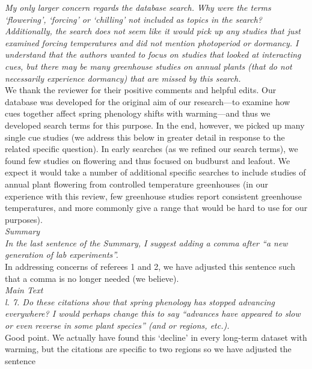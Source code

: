 \documentclass[11pt,letter]{article}
\begin{document}
\emph{My only larger concern regards the database search. Why were the terms `flowering', `forcing' or `chilling' not included as topics in the search? Additionally, the search does not seem like it would pick up any studies that just examined forcing temperatures and did not mention photoperiod or dormancy. I understand that the authors wanted to focus on studies that looked at interacting cues, but there may be many greenhouse studies on annual plants (that do not necessarily experience dormancy) that are missed by this search. }\\

We thank the reviewer for their positive comments and helpful edits. Our database was developed for the original aim of our research---to examine how cues together affect spring phenology shifts with warming---and thus we developed search terms for this purpose. In the end, however, we picked up many single cue studies (we address this below in greater detail in response to the related specific question). In early searches (as we refined our search terms), we found few studies on flowering and thus focused on budburst and leafout. We expect it would take a number of additional specific searches to include studies of annual plant flowering from controlled temperature greenhouses (in our experience with this review, few greenhouse studies report consistent greenhouse temperatures, and more commonly give a range that would be hard to use for our purposes). \\

\emph{Summary }\\

\emph{In the last sentence of the Summary, I suggest adding a comma after “a new generation of lab experiments”. }\\

In addressing concerns of referees 1 and 2, we have adjusted this sentence such that a comma is no longer needed (we believe).\\

\emph{Main Text }\\

\emph{l. 7. Do these citations show that spring phenology has stopped advancing everywhere? I would perhaps change this to say “advances have appeared to slow or even reverse in some plant species” (and or regions, etc.). }\\

Good point. We actually have found this `decline' in every long-term dataset with warming, but the citations are specific to two regions so we have adjusted the sentence\\
\end{document}
